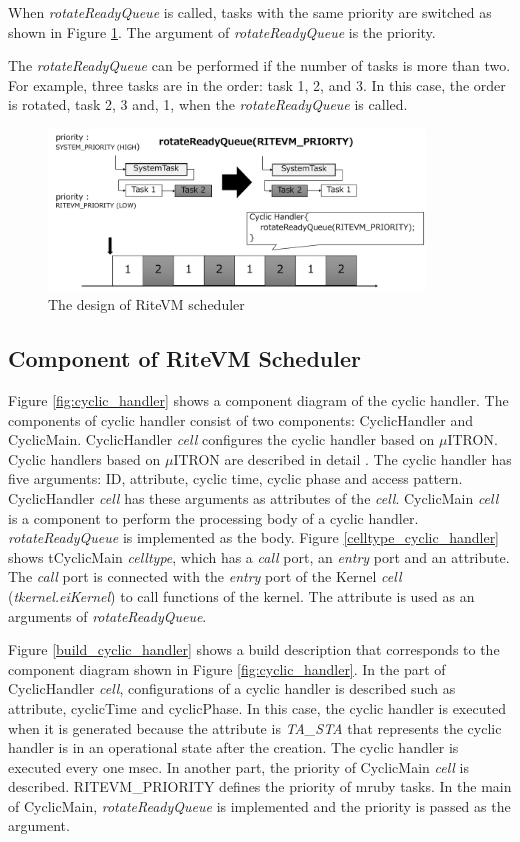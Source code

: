 \documentclass[a4j,12pt,oneside,openany,english]{jsbook}
\begin{document}
When {\it rotateReadyQueue} is called, tasks with the same priority are switched as shown in Figure \ref{fig:rotateReadyQueue}.
The argument of {\it rotateReadyQueue} is the priority.

The {\it rotateReadyQueue} can be performed if the number of tasks is more than two.
For example, three tasks are in the order: task 1, 2, and 3.
In this case, the order is rotated, task 2, 3 and, 1, when the {\it rotateReadyQueue} is called.

\begin{figure}[t]
    \centering
    \includegraphics[width=10cm,clip]{../EMSOFT2016/figure/rotateReadyQueue.pdf}
    \caption{The design of RiteVM scheduler}
    \label{fig:rotateReadyQueue}
\end{figure} 
 
\subsection{Component of RiteVM Scheduler}

Figure \ref{fig:cyclic_handler} shows a component diagram of the cyclic handler.
The components of cyclic handler consist of two components: CyclicHandler and CyclicMain.
CyclicHandler {\it cell} configures the cyclic handler based on $\mu$ITRON.
Cyclic handlers based on $\mu$ITRON are described in detail \cite{par:microITRON}.
The cyclic handler has five arguments: ID, attribute, cyclic time, cyclic phase and access pattern.
CyclicHandler {\it cell} has these arguments as attributes of the {\it cell}.
CyclicMain {\it cell} is a component to perform the processing body of a cyclic handler.
{\it rotateReadyQueue} is implemented as the body.
Figure \ref{celltype_cyclic_handler} shows tCyclicMain {\it celltype}, which has a {\it call} port, an {\it entry} port and an attribute.
The {\it call} port is connected with the {\it entry} port of the Kernel {\it cell} ({\it tkernel.eiKernel}) to call functions of the kernel. 
The attribute is used as an arguments of {\it rotateReadyQueue}.

Figure \ref{build_cyclic_handler} shows a build description that corresponds to the component diagram shown in Figure \ref{fig:cyclic_handler}.
In the part of CyclicHandler {\it cell}, configurations of a cyclic handler is described such as attribute, cyclicTime and cyclicPhase.
In this case, the cyclic handler is executed when it is generated because the attribute is {\it TA\_STA} that represents the cyclic handler is in an operational state after the creation.
The cyclic handler is executed every one msec.
In another part, the priority of CyclicMain {\it cell} is described.
RITEVM\_PRIORITY defines the priority of mruby tasks.
In the main of CyclicMain, {\it rotateReadyQueue} is implemented and the priority is passed as the argument.
\end{document}
